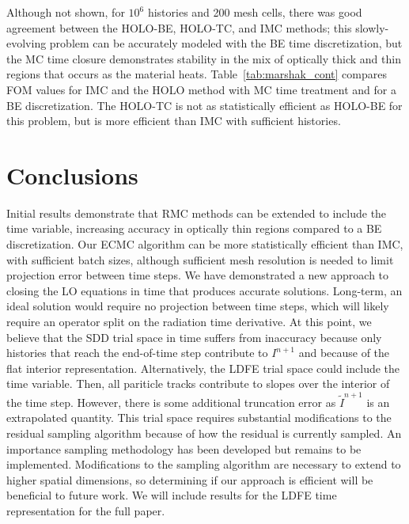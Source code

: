 \documentclass{anstrans}
\begin{document}
Although not shown, for $10^6$ histories and 200 mesh cells, there was good agreement
between the HOLO-BE, HOLO-TC, and IMC methods; this slowly-evolving problem can be accurately modeled with
the BE time
discretization, but the MC time closure demonstrates stability in the mix of optically thick
and thin regions that occurs as the material heats.
Table~\ref{tab:marshak_cont} compares FOM values for IMC and the HOLO method with MC time treatment and for a BE discretization. The HOLO-TC is not as statistically
efficient as HOLO-BE for this problem, but is more efficient than IMC with
sufficient histories.  


\section{Conclusions}

Initial results demonstrate that RMC methods can be extended to include
the time variable, increasing accuracy in optically thin regions compared to a
BE discretization.   Our ECMC algorithm can be more statistically efficient
than IMC, with sufficient batch sizes, although sufficient mesh resolution is needed to limit projection
error between time steps.  We have demonstrated a new approach to
closing the LO equations in time that produces accurate solutions. Long-term, an ideal solution
would require no projection between time steps, which will likely require an operator split
on the radiation time derivative. At this point, we believe that the SDD trial space in time suffers from inaccuracy because
only histories that reach the end-of-time step contribute to $I^{n+1}$ and because of the
flat interior representation.  Alternatively, the LDFE trial space
could include the time variable.  Then, all pariticle tracks contribute to slopes over the interior of the time step.  However, there is some additional truncation
error as $\tilde I^{n+1}$ is an extrapolated quantity.  This trial space requires substantial modifications to the residual sampling
algorithm because of how the residual is currently sampled.  An
importance sampling methodology has been developed but remains to be implemented.  Modifications to the sampling
algorithm are necessary to extend to higher spatial dimensions, so determining if our
approach is efficient will be beneficial to future work. We will include results
for the LDFE time representation for the full paper. 





\end{document}
